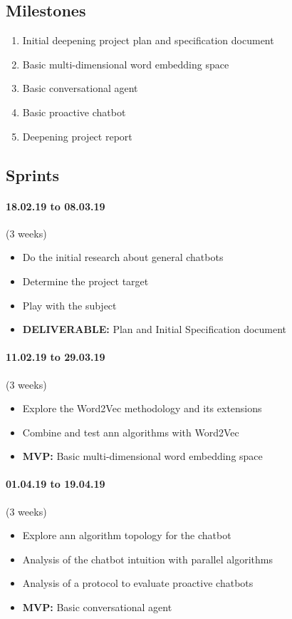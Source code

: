 \subsection{Milestones}
\begin{enumerate}
	\setlength\itemsep{0em}
	\item Initial deepening project plan and specification document
	\item Basic multi-dimensional word embedding space
	\item Basic conversational agent
	\item Basic proactive chatbot
	\item Deepening project report
\end{enumerate}

\subsection{Sprints}

\paragraph{18.02.19 to 08.03.19} (3 weeks) 
\begin{itemize}
	\setlength\itemsep{0em}
	\item Do the initial research about general chatbots
	\item Determine the project target
	\item Play with the subject
	\item \textbf{DELIVERABLE:} Plan and Initial Specification document
\end{itemize}

\paragraph{11.02.19 to 29.03.19} (3 weeks)
\begin{itemize}
	\setlength\itemsep{0em}
	\item Explore the Word2Vec methodology and its extensions
	\item Combine and test \acrshort{ann} algorithms with Word2Vec
	\item \textbf{MVP:} Basic multi-dimensional word embedding space
\end{itemize}

\paragraph{01.04.19 to 19.04.19} (3 weeks)
\begin{itemize}
	\setlength\itemsep{0em}
	\item Explore \acrshort{ann} algorithm topology for the chatbot
	\item Analysis of the chatbot intuition with parallel algorithms
	\item Analysis of a protocol to evaluate proactive chatbots
	\item \textbf{MVP:} Basic conversational agent
\end{itemize}


